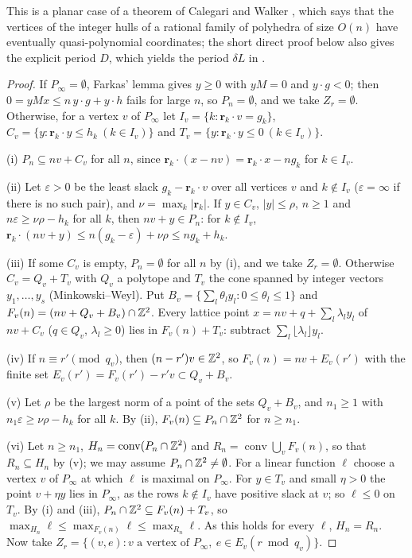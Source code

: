 This is a planar case of a theorem of Calegari and Walker \cite[Thm.~3.5]{calegari2013integer}, which says that the vertices of the integer hulls of a rational family of polyhedra of size $O(n)$ have eventually quasi-polynomial coordinates; the short direct proof below also gives the explicit period $D$, which yields the period $\delta L$ in .

\begin{proof}
If $P_\infty=\emptyset$, Farkas' lemma gives $y\ge0$ with $yM=0$ and $y\cdot g<0$; then $0=yMx\le n\,y\cdot g+y\cdot h$ fails for large $n$, so $P_n=\emptyset$, and we take $Z_r=\emptyset$.
Otherwise, for a vertex $v$ of $P_\infty$ let $I_v=\{k:\mathbf r_k\cdot v=g_k\}$, $C_v=\{y:\mathbf r_k\cdot y\le h_k\ (k\in I_v)\}$ and $T_v=\{y:\mathbf r_k\cdot y\le0\ (k\in I_v)\}$.

(i) $P_n\subseteq nv+C_v$ for all $n$, since $\mathbf r_k\cdot(x-nv)=\mathbf r_k\cdot x-ng_k$ for $k\in I_v$.

(ii) Let $\varepsilon>0$ be the least slack $g_k-\mathbf r_k\cdot v$ over all vertices $v$ and $k\notin I_v$ ($\varepsilon=\infty$ if there is no such pair), and $\nu=\max_k|\mathbf r_k|$.
If $y\in C_v$, $|y|\le\rho$, $n\ge1$ and $n\varepsilon\ge\nu\rho-h_k$ for all $k$, then $nv+y\in P_n$: for $k\notin I_v$, $\mathbf r_k\cdot(nv+y)\le n(g_k-\varepsilon)+\nu\rho\le ng_k+h_k$.

(iii) If some $C_v$ is empty, $P_n=\emptyset$ for all $n$ by (i), and we take $Z_r=\emptyset$.
Otherwise $C_v=Q_v+T_v$ with $Q_v$ a polytope and $T_v$ the cone spanned by integer vectors $y_1,\dots,y_s$ (Minkowski--Weyl).
Put $B_v=\{\sum_l\theta_ly_l:0\le\theta_l\le1\}$ and $F_v(n)=(nv+Q_v+B_v)\cap\mathbb{Z}^2$.
Every lattice point $x=nv+q+\sum_l\lambda_ly_l$ of $nv+C_v$ ($q\in Q_v$, $\lambda_l\ge0$) lies in $F_v(n)+T_v$: subtract $\sum_l\lfloor\lambda_l\rfloor y_l$.

(iv) If $n\equiv r'\pmod{q_v}$, then $(n-r')v\in\mathbb{Z}^2$, so $F_v(n)=nv+E_v(r')$ with the finite set $E_v(r')=F_v(r')-r'v\subset Q_v+B_v$.

(v) Let $\rho$ be the largest norm of a point of the sets $Q_v+B_v$, and $n_1\ge1$ with $n_1\varepsilon\ge\nu\rho-h_k$ for all $k$. By (ii), $F_v(n)\subseteq P_n\cap\mathbb{Z}^2$ for $n\ge n_1$.

(vi) Let $n\ge n_1$, $H_n=\operatorname{conv}(P_n\cap\mathbb{Z}^2)$ and $R_n=\operatorname{conv}\bigcup_vF_v(n)$, so that $R_n\subseteq H_n$ by (v); we may assume $P_n\cap\mathbb{Z}^2\ne\emptyset$.
For a linear function $\ell$ choose a vertex $v$ of $P_\infty$ at which $\ell$ is maximal on $P_\infty$.
For $y\in T_v$ and small $\eta>0$ the point $v+\eta y$ lies in $P_\infty$, as the rows $k\notin I_v$ have positive slack at $v$; so $\ell\le0$ on $T_v$.
By (i) and (iii), $P_n\cap\mathbb{Z}^2\subseteq F_v(n)+T_v$, so $\max_{H_n}\ell\le\max_{F_v(n)}\ell\le\max_{R_n}\ell$.
As this holds for every $\ell$, $H_n=R_n$.
Now take $Z_r=\{(v,e):v\text{ a vertex of }P_\infty,\ e\in E_v(r\bmod q_v)\}$.
\end{proof}

